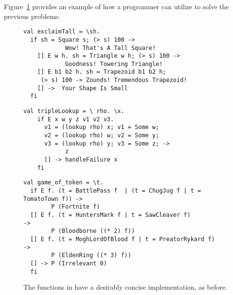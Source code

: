 \documentclass[manuscript,screen,review, 12pt, nonacm]{acmart}
\begin{document}
    Figure~\ref{fig:vminusfuncs} provides an example of how a programmer can
    utilize \VMinus to solve the previous problems: 
    
    
    \begin{figure}[ht] 
      \begin{minipage}[h]{0.54\linewidth}
        \vmlst 
        \begin{lstlisting}[numbers=none, basicstyle=\tiny, xleftmargin=.2em,
          showstringspaces=false,
          frame=single]
val exclaimTall = \sh.
  if sh = Square s; (> s) 100 -> 
            Wow! That's A Tall Square!  
    [] E w h. sh = Triangle w h; (> s) 100 ->
            Goodness! Towering Triangle!
    [] E b1 b2 h. sh = Trapezoid b1 b2 h; 
     (> s) 100 -> Zounds! Tremendous Trapezoid!
    [] ->  Your Shape Is Small
  fi 
  \end{lstlisting}
          \label{fig:vmexclaimtall} 
      \end{minipage}%
      \begin{minipage}[h]{0.5\linewidth}
        \vmlst 
        \begin{lstlisting}[numbers=none, basicstyle=\tiny, xleftmargin=2em,
                      frame=single]
  val tripleLookup = \ rho. \x.
    if E x w y z v1 v2 v3. 
      v1 = (lookup rho) x; v1 = Some w; 
      v2 = (lookup rho) w; v2 = Some y; 
      v3 = (lookup rho) y; v3 = Some z; -> 
            z 
      [] -> handleFailure x
    fi 
   \end{lstlisting}
            \label{fig:vmtriplelookup} 
        \vspace{4ex}
      \end{minipage} 
      \begin{minipage}[h]{\linewidth}
        \vmlst 
        \begin{lstlisting}[numbers=none, basicstyle=\tiny, xleftmargin=9em,
          showstringspaces=false,
          frame=single]
val game_of_token = \t. 
  if E f. (t = BattlePass f  | (t = ChugJug f | t = TomatoTown f)) -> 
        P (Fortnite f)
  [] E f. (t = HuntersMark f | t = SawCleaver f)                   -> 
        P (Bloodborne ((* 2) f))
  [] E f. (t = MoghLordOfBlood f | t = PreatorRykard f)            -> 
        P (EldenRing ((* 3) f))
  [] -> P (Irrelevant 0)
  fi 
\end{lstlisting}
          \label{fig:vmgot}
      \vspace{4ex}
      \end{minipage}%
      \caption{The functions in \VMinus have a desirably concise
      implementation, as before.}
  \label{fig:vminusfuncs}
    \end{figure}   
\end{document}
